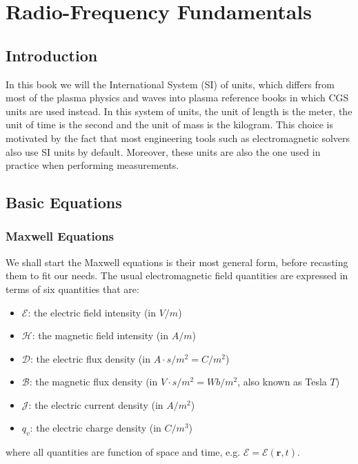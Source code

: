 \chapter{Radio-Frequency Fundamentals}
\section{Introduction}
In this book we will the International System (SI) of units, which differs from most of the plasma physics and waves into plasma reference books in which CGS units are used instead. In this system of units, the unit of length is the meter, the unit of time is the second and the unit of mass is the kilogram. This choice is motivated by the fact that most engineering tools such as electromagnetic solvers also use SI units by default. Moreover, these units are also the one used in practice when performing measurements. 

\section{Basic Equations}
\subsection{Maxwell Equations}
We shall start the Maxwell equations is their most general form, before recasting them to fit our needs. The usual electromagnetic field quantities are expressed in terms of six quantities that are:
\begin{itemize}
 \item $\mathcal{E}$: the electric field intensity (in $V/m$)
 \item $\mathcal{H}$: the magnetic field intensity (in $A/m$)
 \item $\mathcal{D}$: the electric flux density (in $A\cdot s/m^2=C/m^2$)
 \item $\mathcal{B}$: the magnetic flux density (in $V\cdot s/m^2=Wb/m^2$, also known as Tesla $T$)
 \item $\mathcal{J}$: the electric current density (in $A/m^2$)
 \item $q_v$: the electric charge density (in $C/m^3$)
\end{itemize}
where all quantities are function of space and time, e.g. $\mathcal{E}=\mathcal{E}(\mathbf{r},t)$.

